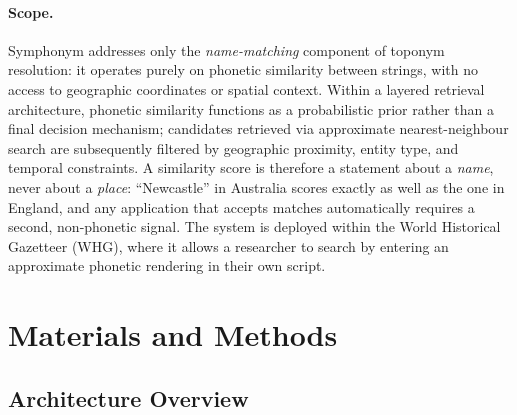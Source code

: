 \documentclass[11pt,a4paper]{article}
\begin{document}
\paragraph{Scope.} Symphonym addresses only the \emph{name-matching} component of toponym resolution: it operates purely on phonetic similarity between strings, with no access to geographic coordinates or spatial context. Within a layered retrieval architecture, phonetic similarity functions as a probabilistic prior rather than a final decision mechanism; candidates retrieved via approximate nearest-neighbour search are subsequently filtered by geographic proximity, entity type, and temporal constraints. A similarity score is therefore a statement about a \emph{name}, never about a \emph{place}: ``Newcastle'' in Australia scores exactly as well as the one in England, and any application that accepts matches automatically requires a second, non-phonetic signal. The system is deployed within the World Historical Gazetteer (WHG), where it allows a researcher to search by entering an approximate phonetic rendering in their own script.


\section{Materials and Methods}
\label{sec:methods}

\subsection{Architecture Overview}
\end{document}
